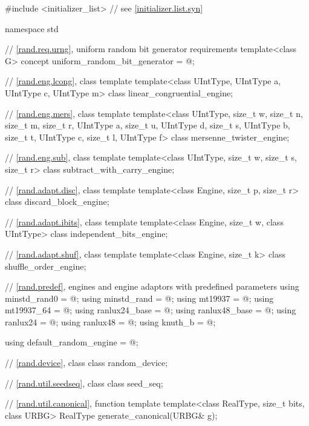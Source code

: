 \begin{codeblock}
#include <initializer_list>     // see \ref{initializer.list.syn}

namespace std {
  // \ref{rand.req.urng}, uniform random bit generator requirements
  template<class G>
    concept uniform_random_bit_generator = @\seebelow@;

  // \ref{rand.eng.lcong}, class template 
  template<class UIntType, UIntType a, UIntType c, UIntType m>
    class linear_congruential_engine;

  // \ref{rand.eng.mers}, class template 
  template<class UIntType, size_t w, size_t n, size_t m, size_t r,
           UIntType a, size_t u, UIntType d, size_t s,
           UIntType b, size_t t,
           UIntType c, size_t l, UIntType f>
    class mersenne_twister_engine;

  // \ref{rand.eng.sub}, class template 
  template<class UIntType, size_t w, size_t s, size_t r>
    class subtract_with_carry_engine;

  // \ref{rand.adapt.disc}, class template 
  template<class Engine, size_t p, size_t r>
    class discard_block_engine;

  // \ref{rand.adapt.ibits}, class template 
  template<class Engine, size_t w, class UIntType>
    class independent_bits_engine;

  // \ref{rand.adapt.shuf}, class template 
  template<class Engine, size_t k>
    class shuffle_order_engine;

  // \ref{rand.predef}, engines and engine adaptors with predefined parameters
  using minstd_rand0  = @\seebelow@;
  using minstd_rand   = @\seebelow@;
  using mt19937       = @\seebelow@;
  using mt19937_64    = @\seebelow@;
  using ranlux24_base = @\seebelow@;
  using ranlux48_base = @\seebelow@;
  using ranlux24      = @\seebelow@;
  using ranlux48      = @\seebelow@;
  using knuth_b       = @\seebelow@;

  using default_random_engine = @\seebelow@;

  // \ref{rand.device}, class 
  class random_device;

  // \ref{rand.util.seedseq}, class 
  class seed_seq;

  // \ref{rand.util.canonical}, function template 
  template<class RealType, size_t bits, class URBG>
    RealType generate_canonical(URBG& g);

}
\end{codeblock}
